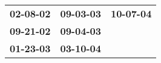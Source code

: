 \begin{supertabular}{p{0.33\columnwidth}p{0.33\columnwidth}p{0.33\columnwidth}}
 \textbf{02-08-02\textsuperscript{}} &  \textbf{09-03-03\textsuperscript{}} &  \textbf{10-07-04\textsuperscript{}} \\
 \textbf{09-21-02\textsuperscript{}} &  \textbf{09-04-03\textsuperscript{}} &                                      \\
 \textbf{01-23-03\textsuperscript{}} &  \textbf{03-10-04\textsuperscript{}} &                                      \\
\end{supertabular}
